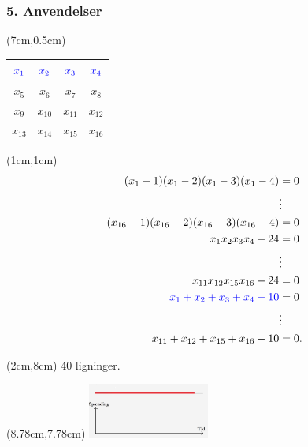 \documentclass[10pt,notheorems,xcolor=pdftex,dvipsnames,table]{beamer}
\renewcommand{\{}{\left\lbrace}
\renewcommand{\}}{\right\rbrace}
\begin{document}
\begin{frame}[t]
\frametitle{
		\LARGE{5. Anvendelser}}
\begin{textblock*}{5cm}(7cm,0.5cm)
\begin{table} 
\begin{tabular}{|c|c||c|c|} 
\hline
${\color{blue}x_1}$ & ${\color{blue}x_2}$ & ${\color{blue}x_3}$ & ${\color{blue}x_4}$\\
\hline
$x_5$ & $x_6$ & $x_7$ & $x_8$ \\
\hline\hline
$x_9$ & $x_{10}$ & $x_{11}$ & $x_{12}$\\
\hline
$x_{13}$ & $x_{14}$ & $x_{15}$ & $x_{16}$\\
\hline
\end{tabular} 
\end{table}
\end{textblock*}
\begin{textblock*}{0.1cm}(1cm,1cm)
\begin{align*}
(x_1-1)(x_1-2)(x_1-3)(x_1-4) &= 0  \\
  &\vdots \\
(x_{16}-1)(x_{16}-2)(x_{16}-3)(x_{16}-4) &= 0\\
x_1x_2x_3x_4 - 24 &= 0  \\
   &\vdots  \\
x_{11}x_{12}x_{15}x_{16} - 24 &= 0 \\
{\color{blue}x_1 + x_2 + x_3 + x_4 - 10} &= 0  \\
  &\vdots  \\
 x_{11} + x_{12} + x_{15} + x_{16} - 10 &= 0. \\
\end{align*}
\end{textblock*}
\begin{textblock*}{5cm}(2cm,8cm)
40 ligninger.
\end{textblock*}
				\begin{textblock*}{0.1cm}(8.78cm,7.78cm)  
					\includegraphics[width=4cm]{disposition/d19.jpg}
				\end{textblock*}	
\end{frame}
\end{document}
